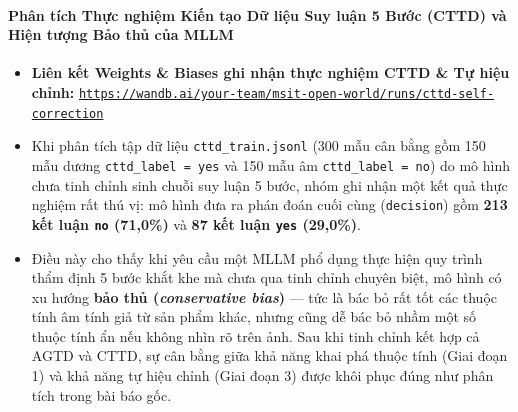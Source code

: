 \documentclass[conference,10pt]{IEEEtran}
\newcommand{\WandBCTTDURL}{https://wandb.ai/your-team/msit-open-world/runs/cttd-self-correction}
\begin{document}
\paragraph{Phân tích Thực nghiệm Kiến tạo Dữ liệu Suy luận 5 Bước (CTTD) và Hiện tượng Bảo thủ của MLLM}
\begin{itemize}
    \item \textbf{Liên kết Weights \& Biases ghi nhận thực nghiệm CTTD \& Tự hiệu chỉnh:} \href{\WandBCTTDURL}{\texttt{\WandBCTTDURL}}
    \item Khi phân tích tập dữ liệu \texttt{cttd\_train.jsonl} (300 mẫu cân bằng gồm 150 mẫu dương \texttt{cttd\_label = yes} và 150 mẫu âm \texttt{cttd\_label = no}) do mô hình chưa tinh chỉnh sinh chuỗi suy luận 5 bước, nhóm ghi nhận một kết quả thực nghiệm rất thú vị: mô hình đưa ra phán đoán cuối cùng (\texttt{decision}) gồm \textbf{213 kết luận \texttt{no} (71,0\%)} và \textbf{87 kết luận \texttt{yes} (29,0\%)}.
    \item Điều này cho thấy khi yêu cầu một MLLM phổ dụng thực hiện quy trình thẩm định 5 bước khắt khe mà chưa qua tinh chỉnh chuyên biệt, mô hình có xu hướng \textbf{bảo thủ (\textit{conservative bias})} --- tức là bác bỏ rất tốt các thuộc tính âm tính giả từ sản phẩm khác, nhưng cũng dễ bác bỏ nhầm một số thuộc tính ẩn nếu không nhìn rõ trên ảnh. Sau khi tinh chỉnh kết hợp cả AGTD và CTTD, sự cân bằng giữa khả năng khai phá thuộc tính (Giai đoạn 1) và khả năng tự hiệu chỉnh (Giai đoạn 3) được khôi phục đúng như phân tích trong bài báo gốc.
\end{itemize}
\end{document}
